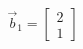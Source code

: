\documentclass[preview]{standalone}
\begin{document}
\begin{align*}
\vec{b}_1 = \begin{bmatrix} 2 \\ 1 \end{bmatrix}
\end{align*}
\end{document}
